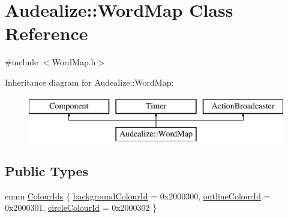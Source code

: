\hypertarget{class_audealize_1_1_word_map}{}\section{Audealize\+:\+:Word\+Map Class Reference}
\label{class_audealize_1_1_word_map}


{\ttfamily \#include $<$Word\+Map.\+h$>$}

Inheritance diagram for Audealize\+:\+:Word\+Map\+:\begin{figure}[H]
\begin{center}
\leavevmode
\includegraphics[height=2.000000cm]{class_audealize_1_1_word_map}
\end{center}
\end{figure}
\subsection*{Public Types}
\begin{DoxyCompactItemize}
\item 
enum \hyperlink{class_audealize_1_1_word_map_a34d16d6553efd00f14cf340ab49d179b}{Colour\+Ids} \{ \hyperlink{class_audealize_1_1_word_map_a34d16d6553efd00f14cf340ab49d179ba673055d4d06fcc8459ee599388acb893}{background\+Colour\+Id} = 0x2000300, 
\hyperlink{class_audealize_1_1_word_map_a34d16d6553efd00f14cf340ab49d179bad8c87f1861b658f7a3cb6b6fca0150c2}{outline\+Colour\+Id} = 0x2000301, 
\hyperlink{class_audealize_1_1_word_map_a34d16d6553efd00f14cf340ab49d179ba56a42bc9960505527d9410ebb42ba7bd}{circle\+Colour\+Id} = 0x2000302
 \}
\end{DoxyCompactItemize}
